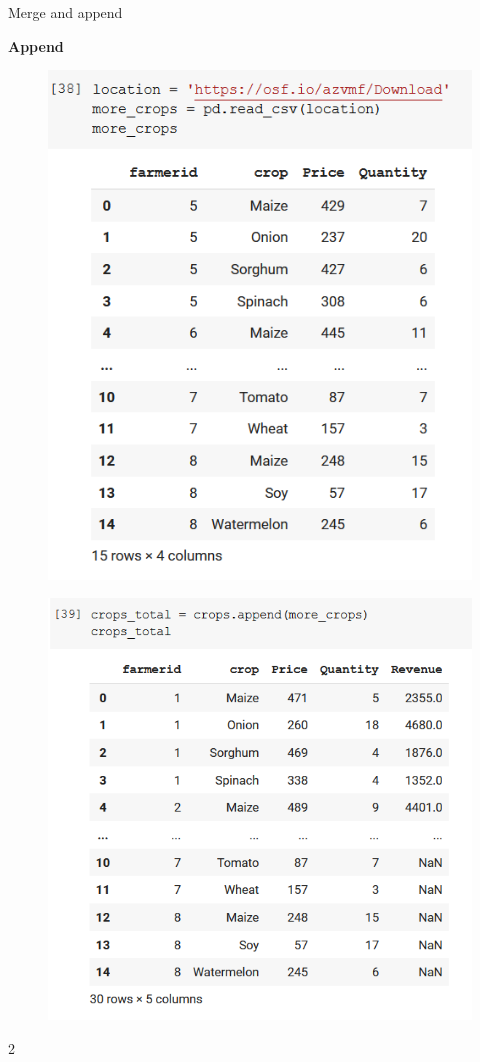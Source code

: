\documentclass[aspectratio=169]{beamer}
\begin{document}
\begin{frame}{Merge and append}

	\textbf{Append}

	\begin{multicols}{2}

		\begin{figure}
			\centering
			\includegraphics[width=0.8\linewidth]{img/more_crops.png}
		\end{figure}
		\begin{figure}
			\centering
			\includegraphics[width=0.9\linewidth]{img/crops_total.png}
		\end{figure}

	\end{multicols}{2}

\end{frame}
\end{document}
